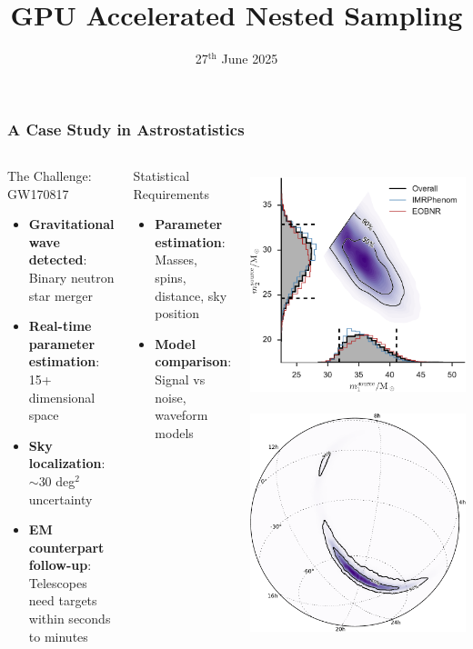 \documentclass[aspectratio=169]{beamer}
\title{GPU Accelerated Nested Sampling}
\date{27$^{\text{th}}$ June 2025}
\begin{document}
\begin{frame}
    \titlepage
\end{frame}

\begin{frame}
    \frametitle{A Case Study in Astrostatistics}
    \begin{columns}
        \vspace{-10pt}
        \begin{block}{The Challenge: GW170817}
            \begin{itemize}
                \item \textbf{Gravitational wave detected}: Binary neutron star merger
                \item \textbf{Real-time parameter estimation}: 15+ dimensional space
                \item \textbf{Sky localization}: $\sim 30$ deg$^2$ uncertainty
                \item \textbf{EM counterpart follow-up}: Telescopes need targets within seconds to minutes
            \end{itemize}
        \end{block}
        \begin{block}{Statistical Requirements}
            \begin{itemize}
                \item \textbf{Parameter estimation}: Masses, spins, distance, sky position
                \item \textbf{Model comparison}: Signal vs noise, waveform models
            \end{itemize}
        \end{block}
        \includegraphics[height=0.49\textwidth]{figures/ligo_m1_m2}
        \includegraphics[height=0.49\textwidth]{figures/ligo_lambert-skymap}

\end{columns}
\end{frame}
\end{document}
